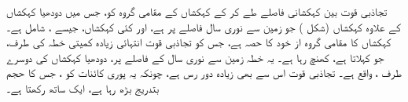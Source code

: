 تجاذبی قوت  بین کہکشانی  فاصلے طے کر کے کہکشاں کے مقامی گروہ کو، جس میں دودھیا کہکشاں کے علاوہ کہکشاں (شکل ) جو زمین  سے  نوری سال فاصلے پر ہے،   اور کئی  کہکشاں، جیسے ، شامل ہے۔ کہکشاں کا مقامی گروہ   از خود  کا حصہ ہے، جس کو تجاذبی قوت  انتہائی زیادہ کمیتی خطہ کی طرف، جو   کہلاتا ہے،  کھنچ رہا ہے۔ یہ خطہ زمین سے   نوری سال کے فاصلے پر، دودھیا کہکشاں کی دوسرے طرف ، واقع ہے۔ تجاذبی قوت اس سے بھی زیادہ دور رس ہے، چونکہ یہ پوری کائنات کو ، جس کا حجم بتدریج بڑھ  رہا ہے،  ایک ساتھ رکھتا ہے۔
